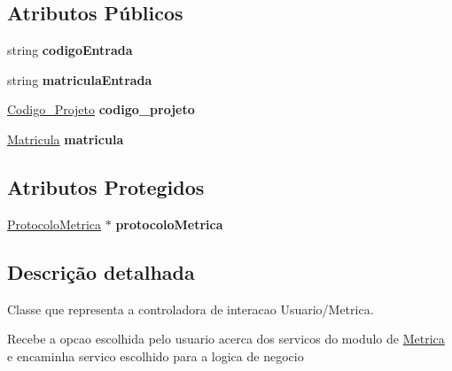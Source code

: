 \subsection*{\-Atributos \-Públicos}
\begin{DoxyCompactItemize}
\item 
\hypertarget{class_cntr_int_metrica_ae451abde34fd518505a15b143222d38f}{
string {\bfseries codigo\-Entrada}}
\label{class_cntr_int_metrica_ae451abde34fd518505a15b143222d38f}

\item 
\hypertarget{class_cntr_int_metrica_aab218b1c2f2daad9325eb16857da1463}{
string {\bfseries matricula\-Entrada}}
\label{class_cntr_int_metrica_aab218b1c2f2daad9325eb16857da1463}

\item 
\hypertarget{class_cntr_int_metrica_a202a3ddf004f9e95f296e343f25cd968}{
\hyperlink{class_codigo___projeto}{\-Codigo\-\_\-\-Projeto} {\bfseries codigo\-\_\-projeto}}
\label{class_cntr_int_metrica_a202a3ddf004f9e95f296e343f25cd968}

\item 
\hypertarget{class_cntr_int_metrica_a2a361cfc08fe506c8c9623d3ce3df6cc}{
\hyperlink{class_matricula}{\-Matricula} {\bfseries matricula}}
\label{class_cntr_int_metrica_a2a361cfc08fe506c8c9623d3ce3df6cc}

\end{DoxyCompactItemize}
\subsection*{\-Atributos \-Protegidos}
\begin{DoxyCompactItemize}
\item 
\hypertarget{class_cntr_int_metrica_a14e81b2a50fb60ef4da48ec4554d9a0c}{
\hyperlink{class_protocolo_metrica}{\-Protocolo\-Metrica} $\ast$ {\bfseries protocolo\-Metrica}}
\label{class_cntr_int_metrica_a14e81b2a50fb60ef4da48ec4554d9a0c}

\end{DoxyCompactItemize}


\subsection{\-Descrição detalhada}
\-Classe que representa a controladora de interacao \-Usuario/\-Metrica. 

\-Recebe a opcao escolhida pelo usuario acerca dos servicos do modulo de \hyperlink{class_metrica}{\-Metrica} e encaminha servico escolhido para a logica de negocio 

